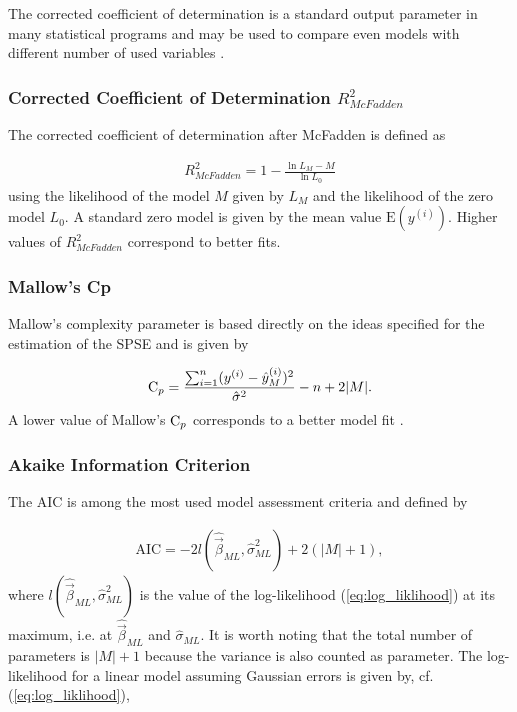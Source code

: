 \documentclass[10pt,a4paper]{report}
\begin{document}
The corrected coefficient of determination is a standard output parameter in many statistical programs and may be used to compare even models with different number of used variables \cite{fahrmeir2007regression}.

\subsubsection{Corrected Coefficient of Determination $R_{McFadden}^2$}

The corrected coefficient of determination after McFadden is defined as

\begin{align}
	R_{McFadden}^2 = 1 - \frac{\ln{L_M} - M}{\ln{L_0}}
\end{align}
%
using the likelihood of the model $M$ given by $L_M$ and the likelihood of the zero model $L_0$. A standard zero model is given by the mean value $\text{E}(y^{(i)})$. Higher values of $R_{McFadden}^2$ correspond to better fits.

\subsubsection{Mallow's Cp}

Mallow's complexity parameter is based directly on the ideas specified for the estimation of the SPSE and is given by

\begin{align}
	\text C_p = \frac{\sum_{i=1}^n (y^{(i)} - \hat y^{(i)}_M)^2}{\hat \sigma^2} - n + 2 \vert M \vert.
\end{align}
%
A lower value of Mallow's $\text C_p$ corresponds to a better model fit \cite{fahrmeir2007regression}.

\subsubsection{Akaike Information Criterion}

The AIC is among the most used model assessment criteria and defined by

\begin{align}
	\text{AIC} = -2 l(\hat{\vec{\beta}}_{ML}, \hat \sigma^2_{ML}) + 2(\vert M \vert +1),
\end{align}
%
where $l(\hat{\vec{\beta}}_{ML}, \hat \sigma^2_{ML})$ is the value of the log-likelihood (\ref{eq:log_liklihood}) at its maximum, i.e. at $\hat{\vec{\beta}}_{ML}$ and $\hat{\sigma}_{ML}$. It is worth noting that the total number of parameters is $\vert M \vert + 1$ because the variance is also counted as parameter. The log-likelihood for a linear model assuming Gaussian errors is given by, cf. (\ref{eq:log_liklihood}),
\end{document}
